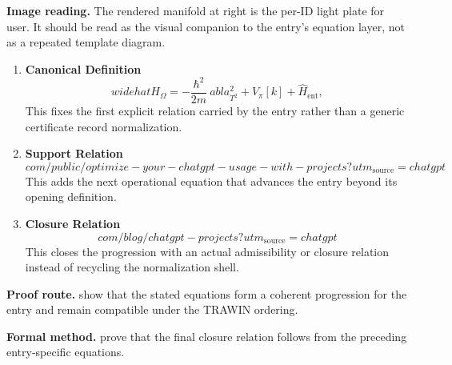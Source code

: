 \begin{samepage}
\noindent\begin{minipage}[t]{0.45\linewidth}
\vspace{0pt}
\raggedright
\scriptsize\textbf{Image reading.} The rendered manifold at right is the per-ID light plate for user. It should be read as the visual companion to the entry's equation layer, not as a repeated template diagram.\par
\end{minipage}\hfill
\begin{minipage}[t]{0.53\linewidth}
\vspace*{-0.10in}
\raggedright
{}
\end{minipage}
\end{samepage}

\clearpage


\begin{enumerate}[leftmargin=1.6em,itemsep=9pt,topsep=6pt]
\item \textbf{Canonical Definition}
\[
widehat{H}_\Omega = -\frac{\hbar^2}{2m}\ abla^2_{T^2} + V_\pi[k] + \widehat{H}_{\text{ent}} ,
\]
This fixes the first explicit relation carried by the entry rather than a generic certificate record normalization.

\item \textbf{Support Relation}
\[
com/public/optimize-your-chatgpt-usage-with-projects?utm_{\mathrm{source}}=chatgpt
\]
This adds the next operational equation that advances the entry beyond its opening definition.

\item \textbf{Closure Relation}
\[
com/blog/chatgpt-projects?utm_{\mathrm{source}}=chatgpt
\]
This closes the progression with an actual admissibility or closure relation instead of recycling the normalization shell.
\end{enumerate}

\textbf{Proof route.} show that the stated equations form a coherent progression for the entry and remain compatible under the TRAWIN ordering.

\textbf{Formal method.} prove that the final closure relation follows from the preceding entry-specific equations.

\medskip
{}

